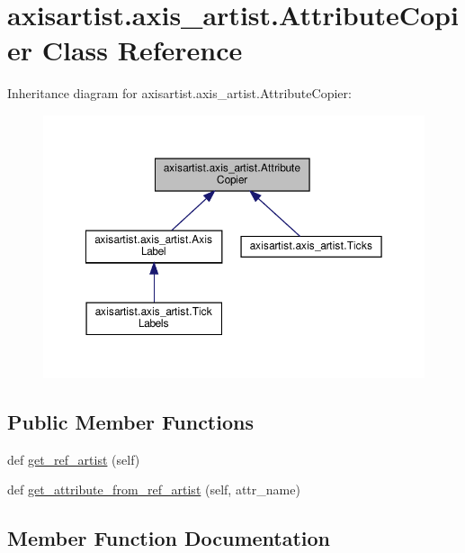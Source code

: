 \hypertarget{classaxisartist_1_1axis__artist_1_1AttributeCopier}{}\section{axisartist.\+axis\+\_\+artist.\+Attribute\+Copier Class Reference}
\label{classaxisartist_1_1axis__artist_1_1AttributeCopier}


Inheritance diagram for axisartist.\+axis\+\_\+artist.\+Attribute\+Copier\+:
\nopagebreak
\begin{figure}[H]
\begin{center}
\leavevmode
\includegraphics[width=350pt]{classaxisartist_1_1axis__artist_1_1AttributeCopier__inherit__graph}
\end{center}
\end{figure}
\subsection*{Public Member Functions}
\begin{DoxyCompactItemize}
\item 
def \hyperlink{classaxisartist_1_1axis__artist_1_1AttributeCopier_a8bb9b221e308625f12c318fe31955485}{get\+\_\+ref\+\_\+artist} (self)
\item 
def \hyperlink{classaxisartist_1_1axis__artist_1_1AttributeCopier_a8d4cd049b04a4ea9d6b0922914b61966}{get\+\_\+attribute\+\_\+from\+\_\+ref\+\_\+artist} (self, attr\+\_\+name)
\end{DoxyCompactItemize}


\subsection{Member Function Documentation}
\mbox{\label{classaxisartist_1_1axis__artist_1_1AttributeCopier_a8d4cd049b04a4ea9d6b0922914b61966}} 
